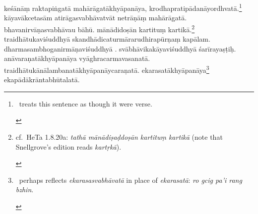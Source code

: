 \documentclass[naipra.tex]{subfiles}
\begin{document}
\begin{sanskrit}
\pstart
keśānāṃ raktapiṅgatā mahārāgatākhyāpanāya, krodhapratipādanāyordhvatā.\footnote{\begin{english}
	\TIB\ treats this sentence as though it were verse.
\end{english}}
kāyavākcetasām atirāgasvabhāvatvāt  netrāṇāṃ mahārāgatā.
bhavanirvāṇasvabhāvau bāhū.
mānādidoṣān kartituṃ kartikā.\footnote{\begin{english}
	cf.\ HeTa 1.8.20a: \emph{tathā mānādiṣaḍdoṣān kartituṃ kartikā} (note that Snellgrove's edition reads \emph{kartṛkā}).
\end{english}}
traidhātukaviśuddhyā skandhādicaturmārarudhirapūrṇaṃ   kapālam.
dharmasambhoganirmāṇaviśuddhyā . %
svābhāvikakāyaviśuddhyā śarīrayaṣṭiḥ.
anāvaraṇatākhyāpanāya vyāghracarmavasanatā.
traidhātukānālambanatākhyāpanāy\crux {}\crux caraṇatā.
ekarasatākhyāpanāya\footnote{\begin{english}
	\TIB\ perhaps reflects \emph{ekarasasvabhāvatā} in place of \emph{ekarasatā}: \emph{ro gcig pa'i rang bzhin}.
\end{english}} ekapādākrāntabhūtalatā. 
\pend




\end{sanskrit}
\end{document}
